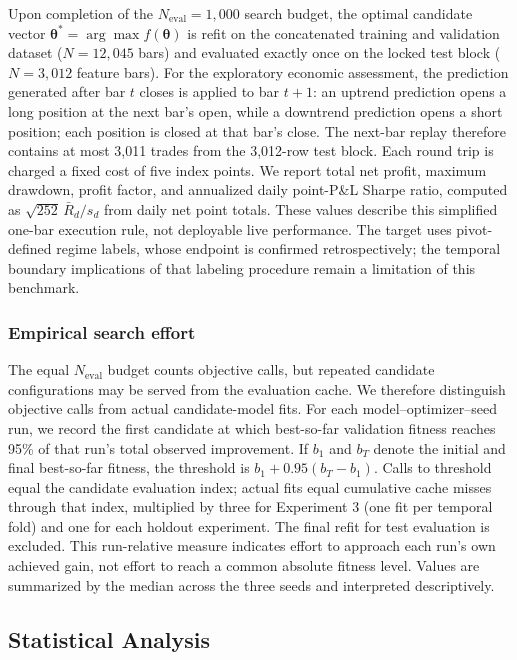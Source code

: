 Upon completion of the $N_{\mathrm{eval}} = 1{,}000$ search budget, the optimal candidate vector $\boldsymbol{\theta}^* = \arg\max f(\boldsymbol{\theta})$ is refit on the concatenated training and validation dataset ($N = 12{,}045$ bars) and evaluated exactly once on the locked test block ($N = 3{,}012$ feature bars). For the exploratory economic assessment, the prediction generated after bar $t$ closes is applied to bar $t+1$: an uptrend prediction opens a long position at the next bar's open, while a downtrend prediction opens a short position; each position is closed at that bar's close. The next-bar replay therefore contains at most 3,011 trades from the 3,012-row test block. Each round trip is charged a fixed cost of five index points. We report total net profit, maximum drawdown, profit factor, and annualized daily point-P\&L Sharpe ratio, computed as $\sqrt{252}\,\bar{R}_{d}/s_{d}$ from daily net point totals. These values describe this simplified one-bar execution rule, not deployable live performance. The target uses pivot-defined regime labels, whose endpoint is confirmed retrospectively; the temporal boundary implications of that labeling procedure remain a limitation of this benchmark.

\subsubsection{Empirical search effort}
\label{sec:empirical_effort}
The equal $N_{\mathrm{eval}}$ budget counts objective calls, but repeated candidate configurations may be served from the evaluation cache. We therefore distinguish objective calls from actual candidate-model fits. For each model--optimizer--seed run, we record the first candidate at which best-so-far validation fitness reaches 95\% of that run's total observed improvement. If $b_1$ and $b_T$ denote the initial and final best-so-far fitness, the threshold is $b_1+0.95(b_T-b_1)$. Calls to threshold equal the candidate evaluation index; actual fits equal cumulative cache misses through that index, multiplied by three for Experiment 3 (one fit per temporal fold) and one for each holdout experiment. The final refit for test evaluation is excluded. This run-relative measure indicates effort to approach each run's own achieved gain, not effort to reach a common absolute fitness level. Values are summarized by the median across the three seeds and interpreted descriptively.

\subsection{Statistical Analysis}
\label{sec:statistical_analysis}

